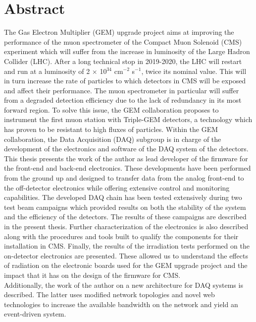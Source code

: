 \chapter*{Abstract}

  The Gas Electron Multiplier (GEM) upgrade project aims at improving the performance of the muon spectrometer of the Compact Muon Solenoid (CMS) experiment which will suffer from the increase in luminosity of the Large Hadron Collider (LHC). After a long technical stop in 2019-2020, the LHC will restart and run at a luminosity of 2 $\times$ 10$^{34}$ cm$^{-2}$ s$^{-1}$, twice its nominal value. This will in turn increase the rate of particles to which detectors in CMS will be exposed and affect their performance. The muon spectrometer in particular will suffer from a degraded detection efficiency due to the lack of redundancy in its most forward region. To solve this issue, the GEM collaboration proposes to instrument the first muon station with Triple-GEM detectors, a technology which has proven to be resistant to high fluxes of particles. Within the GEM collaboration, the Data Acquisition (DAQ) subgroup is in charge of the development of the electronics and software of the DAQ system of the detectors. \\

  This thesis presents the work of the author as lead developer of the firmware for the front-end and back-end electronics. These developments have been performed from the ground up and designed to transfer data from the analog front-end to the off-detector electronics while offering extensive control and monitoring capabilities. The developed DAQ chain has been tested extensively during two test beam campaigns which provided results on both the stability of the system and the efficiency of the detectors. The results of these campaigns are described in the present thesis. Further characterization of the electronics is also described along with the procedures and tools built to qualify the components for their installation in CMS. Finally, the results of the irradiation tests performed on the on-detector electronics are presented. These allowed us to understand the effects of radiation on the electronic boards used for the GEM upgrade project and the impact that it has on the design of the firmware for CMS. \\

  Additionally, the work of the author on a new architecture for DAQ systems is described. The latter uses modified network topologies and novel web technologies to increase the available bandwidth on the network and yield an event-driven system.
